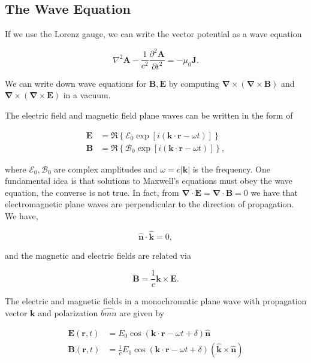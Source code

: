 \documentclass{article}
\numberwithin{equation}{subsection}
\begin{document}
\subsection{The Wave Equation}
If we use the Lorenz gauge, we can write the vector potential as a wave equation 
\begin{meq}
    \begin{equation}
        \nabla^2 \bm{A} - \frac{1}{c^2}\frac{\partial^2 \bm{A}}{\partial t^2} = -\mu_0 \bm{J}.
    \end{equation}
\end{meq}
We can write down wave equations for $\bm{B},\bm{E}$ by computing $\bm{\nabla}\times (\bm{\nabla} \times \bm{B})$ and $\bm{\nabla} \times (\bm{\nabla} \times \bm{E})$ in a vacuum. 

The electric field and magnetic field plane waves can be written in the form of 
\begin{meq}
    \vspace{-4mm}
    \begin{align}
        \bm{E} &= \Re\left\{\mathcal{E}_0 \exp\left[i(\bm{k}\cdot \bm{r} - \omega t)\right]\right\} \\ 
        \bm{B} &= \Re\left\{\mathcal{B}_0 \exp\left[i(\bm{k}\cdot \bm{r} - \omega t)\right]\right\},
    \end{align}
\end{meq}
where $\mathcal{E}_0,\mathcal{B}_0$ are complex amplitudes and $\omega = c|\bm{k}|$ is the frequency. One fundamental idea is that solutions to Maxwell's equations must obey the wave equation, the converse is not true. In fact, from $\bm{\nabla} \cdot \bm{E} = \bm{\nabla} \cdot \bm{B} = 0$ we have that electromagnetic plane waves are perpendicular to the direction of propagation. We have,
\begin{meq}
    \begin{equation}
        \hat{\bm{n}} \cdot \hat{\bm{k}} = 0,
    \end{equation}
\end{meq}
and the magnetic and electric fields are related via 
\begin{meq}
    \begin{equation}
        \bm{B} = \frac{1}{c} \bm{k} \times \bm{E}.
    \end{equation}
\end{meq}
The electric and magnetic fields in a monochromatic plane wave with propagation vector $\bm{k}$ and polarization $\hat{bm{n}}$ are given by
\begin{meq}
    \begin{align}
        \bm{E}(\bm{r},t) &= E_0\cos(\bm{k}\cdot \bm{r} - \omega t + \delta)\hat{\bm{n}} \\ 
        \bm{B}(\bm{r},t) &= \frac{1}{c}E_0 \cos(\bm{k}\cdot \bm{r} - \omega t + \delta)(\hat{\bm{k}} \times \hat{\bm{n}})
    \end{align}
\end{meq}
\end{document}
